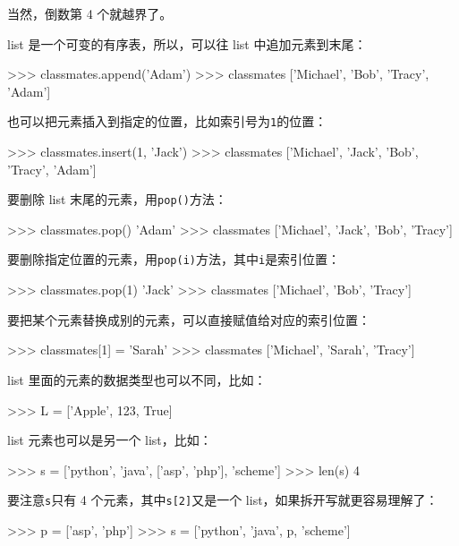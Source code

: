 当然，倒数第 4 个就越界了。

list 是一个可变的有序表，所以，可以往 list 中追加元素到末尾：

\begin{pythoncode}
>>> classmates.append('Adam')
>>> classmates
['Michael', 'Bob', 'Tracy', 'Adam']
\end{pythoncode}

也可以把元素插入到指定的位置，比如索引号为\texttt{1}的位置：

\begin{pythoncode}
>>> classmates.insert(1, 'Jack')
>>> classmates
['Michael', 'Jack', 'Bob', 'Tracy', 'Adam']
\end{pythoncode}

要删除 list 末尾的元素，用\texttt{pop()}方法：

\begin{pythoncode}
>>> classmates.pop()
'Adam'
>>> classmates
['Michael', 'Jack', 'Bob', 'Tracy']
\end{pythoncode}

要删除指定位置的元素，用\texttt{pop(i)}方法，其中\texttt{i}是索引位置：

\begin{pythoncode}
>>> classmates.pop(1)
'Jack'
>>> classmates
['Michael', 'Bob', 'Tracy']
\end{pythoncode}

要把某个元素替换成别的元素，可以直接赋值给对应的索引位置：

\begin{pythoncode}
>>> classmates[1] = 'Sarah'
>>> classmates
['Michael', 'Sarah', 'Tracy']
\end{pythoncode}

list 里面的元素的数据类型也可以不同，比如：

\begin{pythoncode}
>>> L = ['Apple', 123, True]
\end{pythoncode}

list 元素也可以是另一个 list，比如：

\begin{pythoncode}
>>> s = ['python', 'java', ['asp', 'php'], 'scheme']
>>> len(s)
4
\end{pythoncode}

要注意\texttt{s}只有 4 个元素，其中\texttt{s{[}2{]}}又是一个
list，如果拆开写就更容易理解了：

\begin{pythoncode}
>>> p = ['asp', 'php']
>>> s = ['python', 'java', p, 'scheme']
\end{pythoncode}

